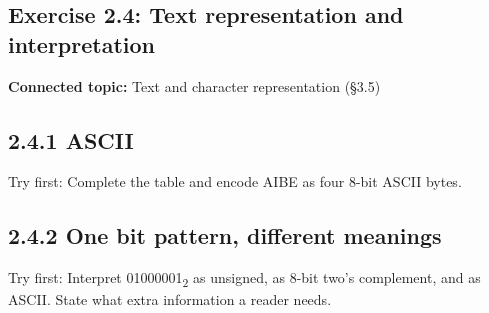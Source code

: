 \documentclass[11pt]{article}
\begin{document}
\begin{keepsection}
\section{Exercise 2.4: Text representation and interpretation}

\textbf{Connected topic:} Text and character representation (§3.5)

\begin{keepsection}
\subsection{2.4.1 ASCII}

Try first: Complete the table and encode AIBE as four 8-bit ASCII bytes.

\end{keepsection}

\begin{keepsection}
\subsection{2.4.2 One bit pattern, different meanings}

Try first: Interpret 01000001\textsubscript{2} as unsigned, as 8-bit two’s complement, and as ASCII. State what extra information a reader needs.

\end{keepsection}
\end{keepsection}
\end{document}
